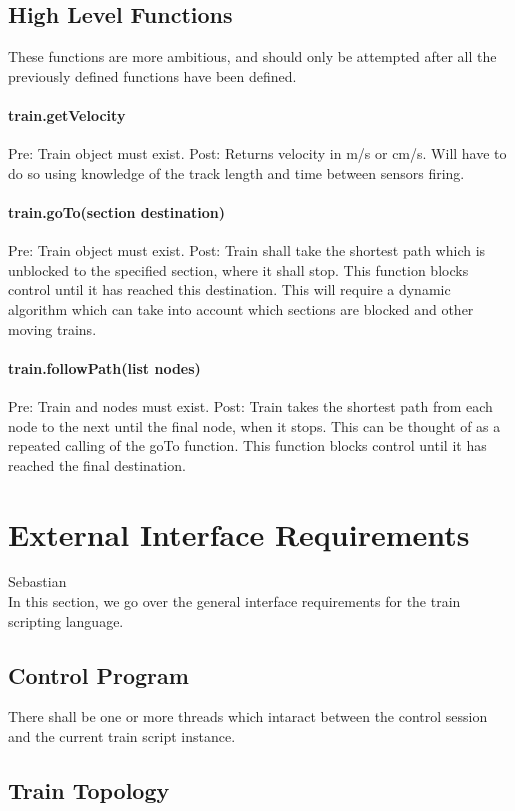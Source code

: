 \documentclass[a4paper,11pt,notitlepage]{article}
\begin{document}
\subsection{High Level Functions}
These functions are more ambitious, and should only be attempted after all the previously defined functions have been defined.
\paragraph{train.getVelocity} Pre: Train object must exist. Post: Returns velocity in m/s or cm/s. Will have to do so using knowledge of the track length and time between sensors firing.
\paragraph{train.goTo(section destination)} Pre: Train object must exist. Post: Train shall take the shortest path which is unblocked to the specified section, where it shall stop. This function blocks control until it has reached this destination. This will require a dynamic algorithm which can take into account which sections are blocked and other moving trains.
\paragraph{train.followPath(list nodes)} Pre: Train and nodes must exist. Post: Train takes the shortest path from each node to the next until the final node, when it stops. This can be thought of as a repeated calling of the goTo function. This function blocks control until it has reached the final destination.

\newpage
\section{External Interface Requirements}
Sebastian\\
    In this section, we go over the general interface requirements for the train scripting language.
\subsection{Control Program}
    There shall be one or more threads which intaract between the control session and the current train script instance.
\subsection{Train Topology}
\end{document}
